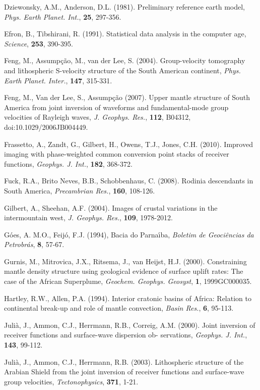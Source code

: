 \documentclass[manuscript,11pt]{geophysics}
\begin{document}
Dziewonsky, A.M., Anderson, D.L. (1981). Preliminary reference earth model, \textit{Phys. Earth Planet. Int.}, \textbf{25},
297-356.

Efron, B., Tibshirani, R. (1991). Statistical data analysis in the computer age, \textit{Science}, \textbf{253}, 390-395.

Feng, M., Assump\c{c}\~ao, M., van der Lee, S. (2004). Group-velocity tomography and lithospheric S-velocity structure of the South American continent, \textit{Phys. Earth Planet. Inter.}, \textbf{147}, 315-331.

Feng, M., Van der Lee, S., Assump\c{c}\~ao (2007). Upper mantle structure of South America from joint inversion of waveforms and fundamental-mode group velocities of Rayleigh waves, \textit{J. Geophys. Res.}, \textbf{112}, B04312, doi:10.1029/2006JB004449.

Frassetto, A., Zandt, G., Gilbert, H., Owens, T.J., Jones, C.H. (2010). Improved imaging with phase-weighted common conversion point stacks of receiver functions, \textit{Geophys. J. Int.}, \textbf{182}, 368-372.

Fuck, R.A., Brito Neves, B.B., Schobbenhaus, C. (2008). Rodinia descendants in South America, \textit{Precambrian Res.}, \textbf{160}, 108-126.

Gilbert, A., Sheehan, A.F. (2004). Images of crustal variations in the intermountain west, \textit{J. Geophys. Res.}, \textbf{109}, 1978-2012.

G\'oes, A. M.O., Feij\'o, F.J. (1994), Bacia do Parna\'{\i}ba, \textit{Boletim de Geoci\^encias da Petrobr\'as}, \textbf{8}, 57-67.

Gurnis, M., Mitrovica, J.X., Ritsema, J., van Heijst, H.J. (2000). Constraining mantle density structure using geological evidence of surface uplift rates: The case of the African Superplume, \textit{Geochem. Geophys. Geosyst}, \textbf{1}, 1999GC000035.

Hartley, R.W., Allen, P.A. (1994). Interior cratonic basins of Africa: Relation to continental break-up and role of mantle convection, \textit{Basin Res.}, \textbf{6}, 95-113.

Juli\`a, J., Ammon, C.J., Herrmann, R.B., Correig, A.M. (2000). Joint inversion of receiver functions and surface-wave dispersion ob- servations, \textit{Geophys. J. Int.}, \textbf{143}, 99-112.

Juli\`a, J., Ammon, C.J., Herrmann, R.B. (2003). Lithospheric structure of the Arabian Shield from the joint inversion of receiver functions and surface-wave group velocities, \textit{Tectonophysics}, \textbf{371}, 1-21.
\end{document}
